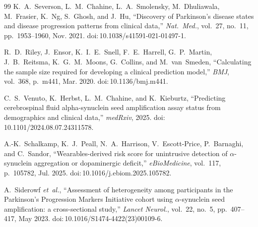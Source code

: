 \begin{thebibliography}{99}
K.~A.~Severson, L.~M.~Chahine, L.~A.~Smolensky, M.~Dhuliawala, M.~Frasier, K.~Ng, S.~Ghosh, and J.~Hu, ``Discovery of Parkinson's disease states and disease progression patterns from clinical data,'' \textit{Nat.\ Med.}, vol.~27, no.~11, pp.~1953--1960, Nov. 2021. doi:\,10.1038/s41591-021-01497-1.

R.~D.~Riley, J.~Ensor, K.~I.~E.~Snell, F.~E.~Harrell, G.~P.~Martin, J.~B.~Reitsma, K.~G.~M.~Moons, G.~Collins, and M.~van~Smeden, ``Calculating the sample size required for developing a clinical prediction model,'' \textit{BMJ}, vol.~368, p.~m441, Mar. 2020. doi:\,10.1136/bmj.m441.

C.~S.~Venuto, K.~Herbst, L.~M.~Chahine, and K.~Kieburtz, ``Predicting cerebrospinal fluid alpha-synuclein seed amplification assay status from demographics and clinical data,'' \textit{medRxiv}, 2025. doi:\,10.1101/2024.08.07.24311578.

A.-K.~Schalkamp, K.~J.~Peall, N.~A.~Harrison, V.~Escott-Price, P.~Barnaghi, and C.~Sandor, ``Wearables-derived risk score for unintrusive detection of $\alpha$-synuclein aggregation or dopaminergic deficit,'' \textit{eBioMedicine}, vol.~117, p.~105782, Jul. 2025. doi:\,10.1016/j.ebiom.2025.105782.

A.~Siderowf \textit{et~al.}, ``Assessment of heterogeneity among participants in the Parkinson's Progression Markers Initiative cohort using $\alpha$-synuclein seed amplification: a cross-sectional study,'' \textit{Lancet Neurol.}, vol.~22, no.~5, pp.~407--417, May 2023. doi:\,10.1016/S1474-4422(23)00109-6.

\end{thebibliography}
